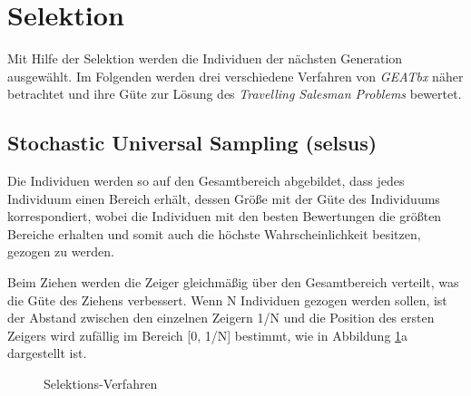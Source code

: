 \section{Selektion}\label{selection}

Mit Hilfe der Selektion werden die Individuen der nächsten Generation ausgewählt.
Im Folgenden werden drei verschiedene Verfahren von \emph{GEATbx} näher betrachtet
und ihre Güte zur Lösung des \emph{Travelling Salesman Problems} bewertet.


\subsection{Stochastic Universal Sampling (selsus)}
Die Individuen werden so auf
den Gesamtbereich abgebildet, dass jedes Individuum einen Bereich erhält, dessen
Größe mit der Güte des Individuums korrespondiert, wobei die Individuen mit den
besten Bewertungen die größten Bereiche erhalten und somit auch die höchste
Wahrscheinlichkeit besitzen, gezogen zu werden.

Beim Ziehen werden die Zeiger gleichmäßig über den Gesamtbereich verteilt, was
die Güte des Ziehens verbessert. Wenn N Individuen gezogen werden sollen, ist
der Abstand zwischen den einzelnen Zeigern 1/N und die Position des ersten
Zeigers wird zufällig im Bereich [0, 1/N] bestimmt, wie in Abbildung
\ref{fig.selection}a dargestellt ist.

\begin{figure}[!h] \centering
    \hfill
    \caption{Selektions-Verfahren \citep{mcl}}
    \label{fig.selection}
\end{figure}


